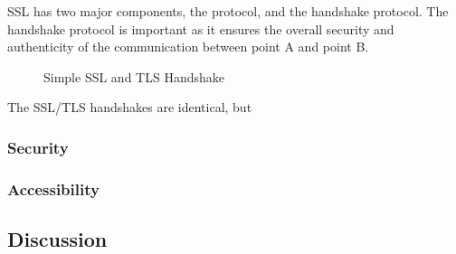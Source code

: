 \documentclass[10pt,letterpaper,onecolumn,draftclsnofoot]{IEEEtran}
\begin{document}
SSL has two major components, the protocol, and the handshake protocol. The
handshake protocol is important as it ensures the overall security and
authenticity of the communication between point A and point B.

\begin{figure}[H]
	\begin{center}
		\caption{Simple SSL and TLS Handshake\cite{ibm-diagram}}
	\end{center}
\end{figure}

The SSL/TLS handshakes are identical, but



\cite{topdown-ssl}

\subsubsection{Security}

\subsubsection{Accessibility}

\subsection{Discussion}
\end{document}
